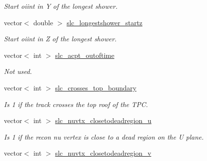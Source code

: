 \begin{DoxyCompactItemize}
\begin{DoxyCompactList}\small\item\em Start oiint in Y of the longest shower. \end{DoxyCompactList}\item 
\hypertarget{classUBXSecEvent_ae022f809b2c73280c6c9eda7cbf18bab}{vector$<$ double $>$ \hyperlink{classUBXSecEvent_ae022f809b2c73280c6c9eda7cbf18bab}{slc\-\_\-longestshower\-\_\-startz}}\label{classUBXSecEvent_ae022f809b2c73280c6c9eda7cbf18bab}

\begin{DoxyCompactList}\small\item\em Start oiint in Z of the longest shower. \end{DoxyCompactList}\item 
\hypertarget{classUBXSecEvent_afd52675b8ca60af2941105f9739909a4}{vector$<$ int $>$ \hyperlink{classUBXSecEvent_afd52675b8ca60af2941105f9739909a4}{slc\-\_\-acpt\-\_\-outoftime}}\label{classUBXSecEvent_afd52675b8ca60af2941105f9739909a4}

\begin{DoxyCompactList}\small\item\em Not used. \end{DoxyCompactList}\item 
\hypertarget{classUBXSecEvent_ae7aee5c97b811d2e867cab5ec4fa1ffd}{vector$<$ int $>$ \hyperlink{classUBXSecEvent_ae7aee5c97b811d2e867cab5ec4fa1ffd}{slc\-\_\-crosses\-\_\-top\-\_\-boundary}}\label{classUBXSecEvent_ae7aee5c97b811d2e867cab5ec4fa1ffd}

\begin{DoxyCompactList}\small\item\em Is 1 if the track crosses the top roof of the T\-P\-C. \end{DoxyCompactList}\item 
\hypertarget{classUBXSecEvent_a702fda60b130a5de87b4cd5639b111d6}{vector$<$ int $>$ \hyperlink{classUBXSecEvent_a702fda60b130a5de87b4cd5639b111d6}{slc\-\_\-nuvtx\-\_\-closetodeadregion\-\_\-u}}\label{classUBXSecEvent_a702fda60b130a5de87b4cd5639b111d6}

\begin{DoxyCompactList}\small\item\em Is 1 if the recon nu vertex is close to a dead region on the U plane. \end{DoxyCompactList}\item 
\hypertarget{classUBXSecEvent_aea1570a2a53f22dcbbe2d0c349502a3b}{vector$<$ int $>$ \hyperlink{classUBXSecEvent_aea1570a2a53f22dcbbe2d0c349502a3b}{slc\-\_\-nuvtx\-\_\-closetodeadregion\-\_\-v}}\label{classUBXSecEvent_aea1570a2a53f22dcbbe2d0c349502a3b}


\end{DoxyCompactItemize}
